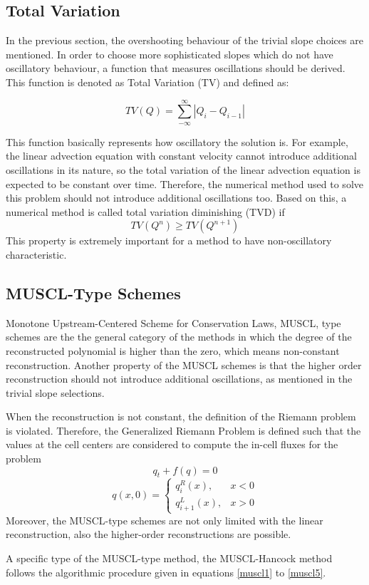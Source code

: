 \documentclass[journal,onecolumn]{IEEEtran}
\begin{document}
\subsection{Total Variation}
In the previous section, the overshooting behaviour of the trivial slope choices are mentioned. In order to choose more sophisticated slopes which do not have oscillatory behaviour, a function that measures oscillations should be derived. This function is denoted as Total Variation (TV) and defined as:

$$
    TV(Q) = \sum_{-\infty}^{\infty} | Q_i - Q_{i-1} |
$$

This function basically represents how oscillatory the solution is. For example, the linear advection equation with constant velocity cannot introduce additional oscillations in its nature, so the total variation of the linear advection equation is expected to be constant over time. Therefore, the numerical method used to solve this problem should not introduce additional oscillations too. Based on this, a numerical method is called total variation diminishing (TVD) if
$$
    TV(Q^n) \geq TV(Q^{n+1})
$$
This property is extremely important for a method to have non-oscillatory characteristic.

\subsection{MUSCL-Type Schemes}
Monotone Upstream-Centered Scheme for Conservation Laws, MUSCL, type schemes are the the general category of the methods in which the degree of the reconstructed polynomial is higher than the zero, which means non-constant reconstruction. Another property of the MUSCL schemes is that the higher order reconstruction should not introduce additional oscillations, as mentioned in the trivial slope selections.
\par
When the reconstruction is not constant, the definition of the Riemann problem is violated. Therefore, the Generalized Riemann Problem is defined such that the values at the cell centers are considered to compute the in-cell fluxes for the problem
$$
q_t + f(q) = 0
$$
\[ q(x,0) =   \left\{
\begin{array}{ll}
      q_i^R(x), & x < 0 \\
      q_{i+1}^L(x), & x > 0
\end{array} 
\right. \]
Moreover, the MUSCL-type schemes are not only limited with the linear reconstruction, also the higher-order reconstructions are possible. 
\par
A specific type of the MUSCL-type method, the MUSCL-Hancock method follows the algorithmic procedure given in equations \ref{muscl1} to \ref{muscl5}.
\end{document}
